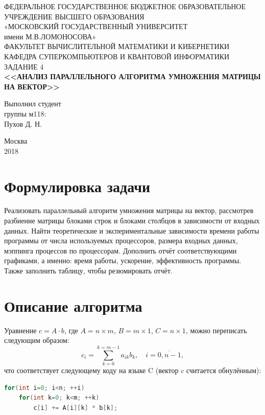 \documentclass[14pt]{extarticle}
\begin{document}
\begin{titlepage}
	\begin{center}
		\small{ФЕДЕРАЛЬНОЕ ГОСУДАРСТВЕННОЕ БЮДЖЕТНОЕ ОБРАЗОВАТЕЛЬНОЕ}\\ 
			УЧРЕЖДЕНИЕ ВЫСШЕГО ОБРАЗОВАНИЯ\\
			«МОСКОВСКИЙ ГОСУДАРСТВЕННЫЙ УНИВЕРСИТЕТ\\
			имени М.В.ЛОМОНОСОВА»\\
		\hfill \break
		ФАКУЛЬТЕТ ВЫЧИСЛИТЕЛЬНОЙ МАТЕМАТИКИ И КИБЕРНЕТИКИ\\
		КАФЕДРА СУПЕРКОМПЬЮТЕРОВ И КВАНТОВОЙ ИНФОРМАТИКИ\\
		\vfill
		ЗАДАНИЕ 4 \\
		\textbf{<<АНАЛИЗ ПАРАЛЛЕЛЬНОГО АЛГОРИТМА УМНОЖЕНИЯ МАТРИЦЫ НА ВЕКТОР>>}\\
	\end{center}	
	\vfill
	\begin{flushright}
		Выполнил студент \\
		группы м118:\\
		Пухов Д. Н.\\
		{\hspace{3cm}}
	\end{flushright}
	
	
	\begin{center}
		Москва \\
		2018
	\end{center}
	
	\thispagestyle{empty}

\end{titlepage}

\tableofcontents
\newpage



\section{Формулировка задачи}
Реализовать параллельный алгоритм умножения матрицы на вектор, рассмотрев разбиение матрицы блоками строк и блоками столбцов в зависимости от входных данных. Найти теоретические и экспериментальные зависимости времени работы программы от числа используемых процессоров, размера входных данных, мэппинга процессов по процессорам. Дополнить отчёт соответствующими графиками, а именно: время работы, ускорение, эффективность программы. Также заполнить таблицу, чтобы резюмировать отчёт.

\section{Описание алгоритма}
Уравнение $ c = A \cdot b $, где $ A = n \times m $, $ B = m \times 1 $, $ C = n \times 1 $, можно переписать следующим образом:
\begin{equation*}
c_{i} = \sum \limits_{k=0}^{k=m-1} a_{ik} b_{k}, \quad i = \overline{0,n-1},
\end{equation*}
что соответствует следующему коду на языке C (вектор $c$ считается обнулённым):
\begin{lstlisting}[language=C]
for(int i=0; i<n; ++i)
	for(int k=0; k<m; ++k)
		c[i] += A[i][k] * b[k];
\end{lstlisting}
\end{document}
